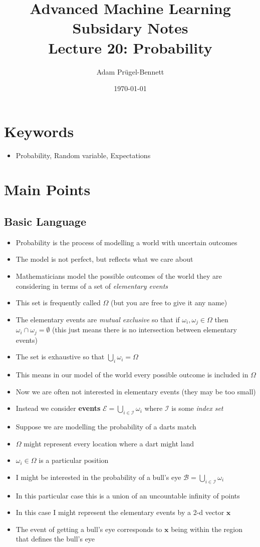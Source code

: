 \documentclass[11pt]{article}
\author{Adam Prügel-Bennett}
\date{\today}
\title{Advanced Machine Learning Subsidary Notes\\\medskip
\large Lecture 20: Probability}
\begin{document}
\maketitle

\section{Keywords}
\label{sec:org8fe2874}
\begin{itemize}
\item Probability, Random variable, Expectations
\end{itemize}

\section{Main Points}
\label{sec:orgfe3601a}
\subsection{Basic Language}
\label{sec:org5265ddd}
\begin{itemize}
\item Probability is the process of modelling a world with uncertain outcomes
\item The model is not perfect, but reflects what we care about
\item Mathematicians model the possible outcomes of the world they are
considering in terms of a set of \emph{elementary events}
\item This set is frequently called \(\Omega\) (but you are free to give
it any name)
\item The elementary events are \emph{mutual exclusive} so that if
\(\omega_{i}, \omega_{j} \in \Omega\) then \(\omega_{i} \cap
     \omega_{j} = \emptyset\) (this just means there is no intersection
between elementary events)
\item The set is exhaustive so that \(\bigcup_i \omega_i= \Omega\)
\item This means in our model of the world every possible outcome is
included in \(\Omega\)
\item Now we are often not interested in elementary events (they may be
too small)
\item Instead we consider \textbf{events} \(\mathcal{E}=
      \bigcup\limits_{i\in\mathcal{I}}\omega_i\) where \(\mathcal{I}\) is
some \emph{index set}
\item Suppose we are modelling the probability of a darts match
\item \(\Omega\) might represent every location where a dart might land
\item \(\omega_{i}\in \Omega\) is a particular position
\item I might be interested in the probability of a bull's eye
\(\mathcal{B}= \bigcup\limits_{i\in\mathcal{I}}\omega_i\)
\item In this particular case this is a union of an uncountable
infinity of points
\item In this case I might represent the elementary events by a 2-d vector
\(\bm{x}\)
\item The event of getting a bull's eye corresponds to \(\bm{x}\) being
within the region that defines the bull's eye
\end{itemize}
\end{document}
